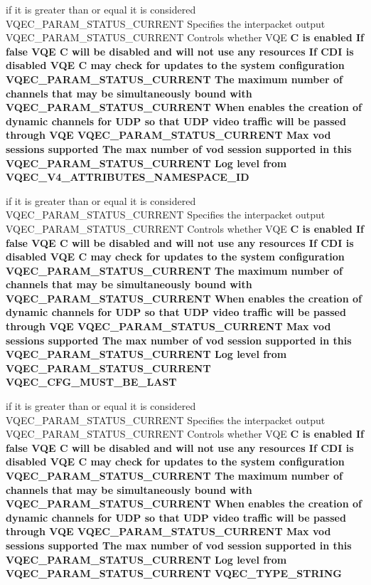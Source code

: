 \begin{CompactItemize}
\item 
if it is greater than or equal it is considered VQEC\_\-PARAM\_\-STATUS\_\-CURRENT Specifies the interpacket output VQEC\_\-PARAM\_\-STATUS\_\-CURRENT Controls whether VQE \bf{C} is enabled If false VQE \bf{C} will be disabled and will not use any resources If CDI is disabled VQE \bf{C} may check for updates \bf{to} the system configuration VQEC\_\-PARAM\_\-STATUS\_\-CURRENT The maximum number of \bf{channels} that may be simultaneously bound with VQEC\_\-PARAM\_\-STATUS\_\-CURRENT When enables the creation of dynamic \bf{channels} for UDP so that UDP video traffic will be passed through VQE VQEC\_\-PARAM\_\-STATUS\_\-CURRENT Max vod sessions supported The max number of vod session supported in \bf{this} VQEC\_\-PARAM\_\-STATUS\_\-CURRENT Log level from \bf{VQEC\_\-V4\_\-ATTRIBUTES\_\-NAMESPACE\_\-ID}
\item 
if it is greater than or equal it is considered VQEC\_\-PARAM\_\-STATUS\_\-CURRENT Specifies the interpacket output VQEC\_\-PARAM\_\-STATUS\_\-CURRENT Controls whether VQE \bf{C} is enabled If false VQE \bf{C} will be disabled and will not use any resources If CDI is disabled VQE \bf{C} may check for updates \bf{to} the system configuration VQEC\_\-PARAM\_\-STATUS\_\-CURRENT The maximum number of \bf{channels} that may be simultaneously bound with VQEC\_\-PARAM\_\-STATUS\_\-CURRENT When enables the creation of dynamic \bf{channels} for UDP so that UDP video traffic will be passed through VQE VQEC\_\-PARAM\_\-STATUS\_\-CURRENT Max vod sessions supported The max number of vod session supported in \bf{this} VQEC\_\-PARAM\_\-STATUS\_\-CURRENT Log level from VQEC\_\-PARAM\_\-STATUS\_\-CURRENT \bf{VQEC\_\-CFG\_\-MUST\_\-BE\_\-LAST}
\item 
if it is greater than or equal it is considered VQEC\_\-PARAM\_\-STATUS\_\-CURRENT Specifies the interpacket output VQEC\_\-PARAM\_\-STATUS\_\-CURRENT Controls whether VQE \bf{C} is enabled If false VQE \bf{C} will be disabled and will not use any resources If CDI is disabled VQE \bf{C} may check for updates \bf{to} the system configuration VQEC\_\-PARAM\_\-STATUS\_\-CURRENT The maximum number of \bf{channels} that may be simultaneously bound with VQEC\_\-PARAM\_\-STATUS\_\-CURRENT When enables the creation of dynamic \bf{channels} for UDP so that UDP video traffic will be passed through VQE VQEC\_\-PARAM\_\-STATUS\_\-CURRENT Max vod sessions supported The max number of vod session supported in \bf{this} VQEC\_\-PARAM\_\-STATUS\_\-CURRENT Log level from VQEC\_\-PARAM\_\-STATUS\_\-CURRENT \bf{VQEC\_\-TYPE\_\-STRING}

\end{CompactItemize}
